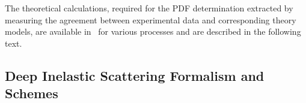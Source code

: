 
\def\kt{\ensuremath{k_t}}
\newcommand{\Pmax}{p}
\newcommand{\CCFM}{CCFMa,CCFMb,Catani:1989sg,CCFMd}


%
The theoretical calculations, required for the PDF determination extracted by measuring 
the agreement between experimental data and corresponding theory models, are
available in \fitter\  for various processes and are described in the following text.



\subsection{Deep Inelastic Scattering Formalism and Schemes}


